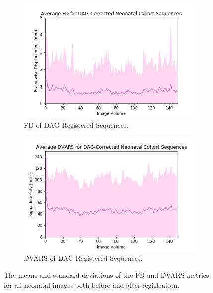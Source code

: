 \begin{figure}[]
	\begin{subfigure}{0.4\textwidth}
		\centering
		\includegraphics[width=1.0\textwidth]{6/figures/neonates-dag-fd-150.png}
		\caption{FD of DAG-Registered Sequences.}
	\end{subfigure}
	\hspace{0.05\textwidth}
	\begin{subfigure}{0.4\textwidth}
		\centering
		\includegraphics[width=1.0\textwidth]{6/figures/neonates-dag-dvars-150.png}
		\caption{DVARS of DAG-Registered Sequences.}
	\end{subfigure}
\caption{The means and standard deviations of the FD and DVARS metrics for all neonatal images both before and after registration.}
\label{fig:neonate-power-dists}
\end{figure}

